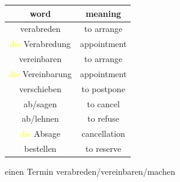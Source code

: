 \begin{center}
    \begin{tabular}{|c|c|}
        \hline
        \rowcolor{gray}
        word                                 & meaning      \\
        \hline
        verabreden                           & to arrange   \\
        \hline
        \textcolor{yellow}{die} Verabredung  & appointment  \\
        \hline
        vereinbaren                          & to arrange   \\
        \hline
        \textcolor{yellow}{die} Vereinbarung & appointment  \\
        \hline
        verschieben                          & to postpone  \\
        \hline
        ab/sagen                             & to cancel    \\
        ab/lehnen                            & to refuse    \\
        \hline
        \textcolor{yellow}{die} Absage       & cancellation \\
        \hline
        bestellen                            & to reserve   \\
        \hline
    \end{tabular}
\end{center}

einen Termin verabreden/vereinbaren/machen

